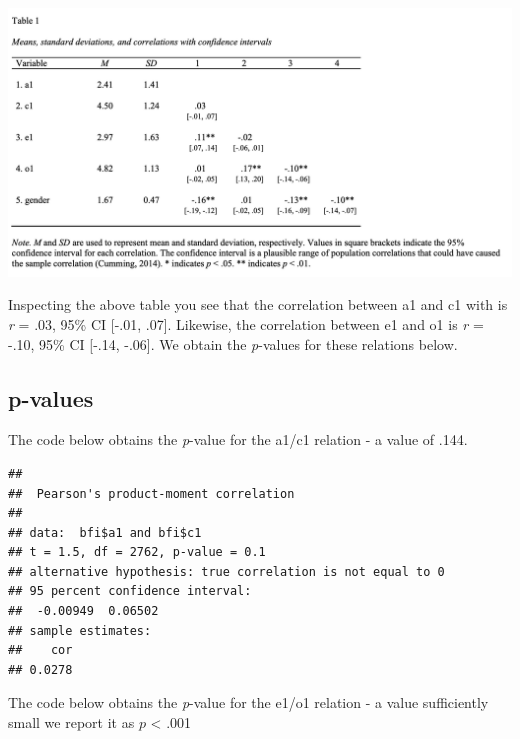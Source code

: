 \documentclass[
]{krantz}
\makeatletter
\newenvironment{Shaded}{\begin{snugshade}}{\end{snugshade}}
\newcommand{\FunctionTok}[1]{\textcolor[rgb]{0,0,0}{#1}}
\newcommand{\NormalTok}[1]{#1}
\newcommand{\SpecialCharTok}[1]{\textcolor[rgb]{0,0,0}{#1}}
\newenvironment{kframe}{%
\medskip{}
\setlength{\fboxsep}{.8em}
 \def\at@end@of@kframe{}%
 \ifinner\ifhmode%
  \def\at@end@of@kframe{\end{minipage}}%
  \begin{minipage}{\columnwidth}%
 \fi\fi%
 \def\FrameCommand##1{\hskip\@totalleftmargin \hskip-\fboxsep
 \colorbox{shadecolor}{##1}\hskip-\fboxsep
     \hskip-\linewidth \hskip-\@totalleftmargin \hskip\columnwidth}%
 \MakeFramed {\advance\hsize-\width
   \@totalleftmargin\z@ \linewidth\hsize
   \@setminipage}}%
 {\par\unskip\endMakeFramed%
 \at@end@of@kframe}
\renewenvironment{Shaded}{\begin{kframe}}{\end{kframe}}
\makeatother
\begin{document}
\includegraphics[width=0.8\linewidth]{ch_correlation/images/table1_bfi}

Inspecting the above table you see that the correlation between a1 and c1 with is \emph{r} = .03, 95\% CI {[}-.01, .07{]}. Likewise, the correlation between e1 and o1 is \emph{r} = -.10, 95\% CI {[}-.14, -.06{]}. We obtain the \emph{p}-values for these relations below.

\hypertarget{p-values}{%
\subsection{p-values}\label{p-values}}

The code below obtains the \emph{p}-value for the a1/c1 relation - a value of .144.

\begin{Shaded}
\end{Shaded}

\begin{verbatim}
## 
##  Pearson's product-moment correlation
## 
## data:  bfi$a1 and bfi$c1
## t = 1.5, df = 2762, p-value = 0.1
## alternative hypothesis: true correlation is not equal to 0
## 95 percent confidence interval:
##  -0.00949  0.06502
## sample estimates:
##    cor 
## 0.0278
\end{verbatim}

The code below obtains the \emph{p}-value for the e1/o1 relation - a value sufficiently small we report it as \(p\) \textless{} .001

\begin{Shaded}
\end{Shaded}
\end{document}
